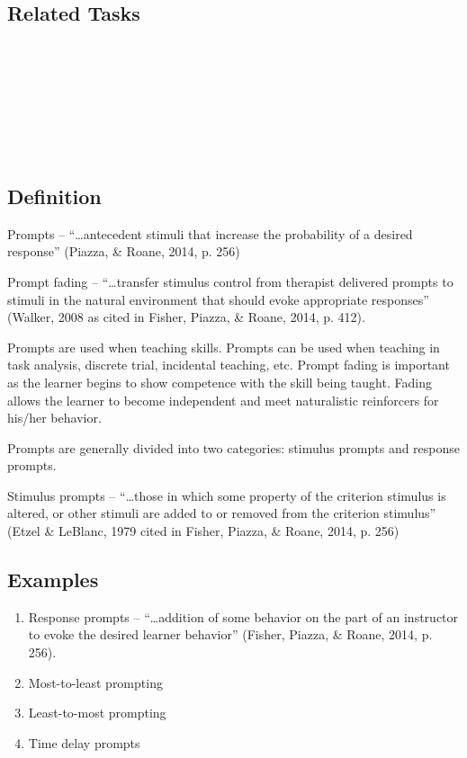 \subsection{Related Tasks}
\fourdNineteen{}\\
\fourdTwenty{}\\
\fourdTwentyOne{}\\
\fourFKTwentyOne{}\\
\fourFKFourty{}\\
\fourFKFourtyOne{}\\
%
%
%
%
\section{\fourdThree{}}
\subsection{Definition}
Prompts – ``…antecedent stimuli that increase the probability of a desired response'' (Piazza, \& Roane, 2014, p. 256)

Prompt fading – ``…transfer stimulus control from therapist delivered prompts to stimuli in the natural environment that should evoke appropriate responses'' (Walker, 2008 as cited in Fisher, Piazza, \& Roane, 2014, p. 412).

Prompts are used when teaching skills. Prompts can be used when teaching in task analysis, discrete trial, incidental teaching, etc. Prompt fading is important as the learner begins to show competence with the skill being taught. Fading allows the learner to become independent and meet naturalistic reinforcers for his/her behavior.

Prompts are generally divided into two categories: stimulus prompts and response prompts.

Stimulus prompts – ``…those in which some property of the criterion stimulus is altered, or other stimuli are added to or removed from the criterion stimulus'' (Etzel \& LeBlanc, 1979 cited in Fisher, Piazza, \& Roane, 2014, p. 256)
\subsection{Examples}
\begin{enumerate}
\item Response prompts – ``…addition of some behavior on the part of an instructor to evoke the desired learner behavior'' (Fisher, Piazza, \& Roane, 2014, p. 256).
\item Most-to-least prompting
\item Least-to-most prompting
\item Time delay prompts
\end{enumerate}
%

